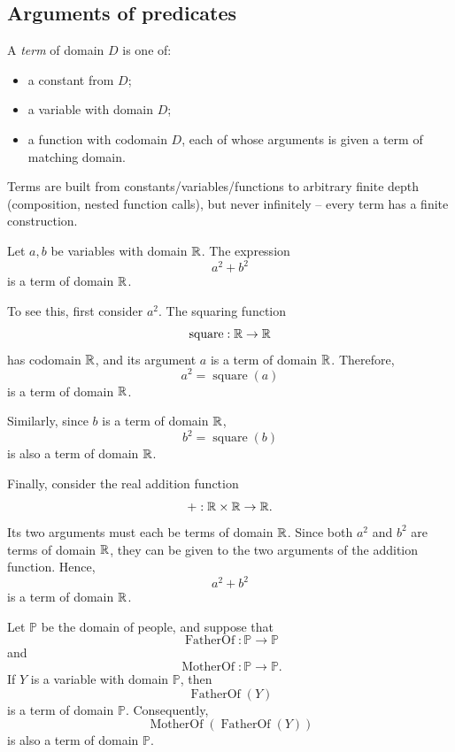 \subsection{Arguments of predicates}
\label{sec:5-4}

\begin{definition}
A \emph{term} of domain $D$ is one of:
\begin{itemize}
    \item a constant from $D$;
    \item a variable with domain $D$;
    \item a function with codomain $D$, each of whose arguments is given a term of matching domain.
\end{itemize}
\end{definition}

\begin{note}
Terms are built from constants/variables/functions to arbitrary finite depth (composition, nested function calls), but never infinitely -- every term has a finite construction.
\end{note}

\begin{example}
Let $a,b$ be variables with domain $\mathbb{R}$. The expression
\[
a^2+b^2
\]
is a term of domain $\mathbb{R}$.

To see this, first consider $a^2$. The squaring function
\[
\operatorname{square}:\mathbb{R}\to\mathbb{R}
\]
has codomain $\mathbb{R}$, and its argument $a$ is a term of domain $\mathbb{R}$. Therefore,
\[
a^2=\operatorname{square}(a)
\]
is a term of domain $\mathbb{R}$.

Similarly, since $b$ is a term of domain $\mathbb{R}$,
\[
b^2=\operatorname{square}(b)
\]
is also a term of domain $\mathbb{R}$.

Finally, consider the real addition function
\[
+:\mathbb{R}\times\mathbb{R}\to\mathbb{R}.
\]
Its two arguments must each be terms of domain $\mathbb{R}$. Since both $a^2$ and $b^2$ are terms of domain $\mathbb{R}$, they can be given to the two arguments of the addition function. Hence,
\[
a^2+b^2
\]
is a term of domain $\mathbb{R}$.
\end{example}

\begin{example}
Let $\mathbb P$ be the domain of people, and suppose that
\[
\operatorname{FatherOf}:\mathbb P\to\mathbb P
\]
and
\[
\operatorname{MotherOf}:\mathbb P\to\mathbb P.
\]
If $Y$ is a variable with domain $\mathbb P$, then
\[
\operatorname{FatherOf}(Y)
\]
is a term of domain $\mathbb P$. Consequently,
\[
\operatorname{MotherOf}(\operatorname{FatherOf}(Y))
\]
is also a term of domain $\mathbb P$.
\end{example}


